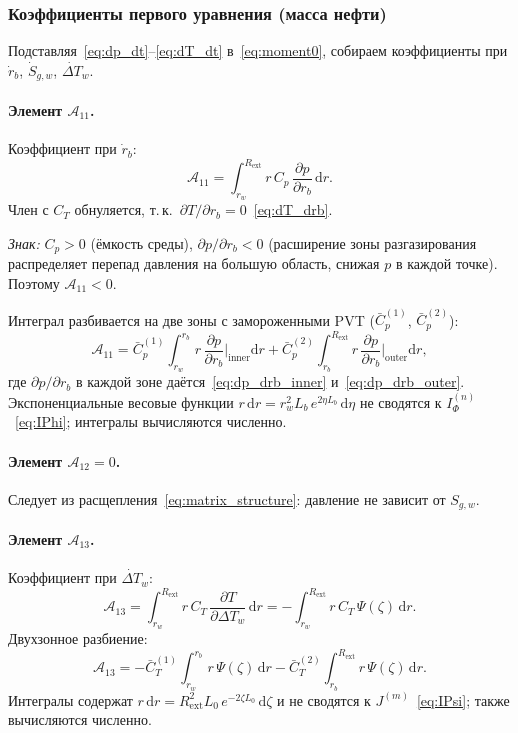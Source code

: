 \documentclass[12pt,a4paper]{article}
\newcommand{\dd}{\mathrm{d}}
\newcommand{\pp}{\partial}
\newcommand{\ext}{\mathrm{ext}}
\begin{document}
\subsubsection{Коэффициенты первого уравнения (масса нефти)}
\label{sssec:oil_mass_coefficients}

Подставляя~\eqref{eq:dp_dt}--\eqref{eq:dT_dt}
в~\eqref{eq:moment0}, собираем коэффициенты
при $\dot{r}_b$, $\dot{S}_{g,w}$, $\dot{\Delta T}_w$.

\paragraph{Элемент $\mathcal{A}_{11}$.}
Коэффициент при $\dot{r}_b$:
\begin{equation}\label{eq:A11}
  \boxed{
    \mathcal{A}_{11}
    = \int_{r_w}^{R_\ext} r\,C_p\,
      \frac{\pp p}{\pp r_b}\,\dd r.
  }
\end{equation}
Член с $C_T$ обнуляется, т.\,к.\ $\pp T/\pp r_b = 0$~\eqref{eq:dT_drb}.

\emph{Знак:} $C_p > 0$ (ёмкость среды),
$\pp p/\pp r_b < 0$ (расширение зоны разгазирования
распределяет перепад давления на большую область,
снижая $p$ в каждой точке).
Поэтому $\mathcal{A}_{11} < 0$.

Интеграл разбивается на две зоны с замороженными PVT
($\bar{C}_p^{(1)}$, $\bar{C}_p^{(2)}$):
\begin{equation}\label{eq:A11_zones}
  \mathcal{A}_{11}
  = \bar{C}_p^{(1)}\!\int_{r_w}^{r_b} r\,
      \frac{\pp p}{\pp r_b}\bigg|_\text{inner}\dd r
    + \bar{C}_p^{(2)}\!\int_{r_b}^{R_\ext} r\,
      \frac{\pp p}{\pp r_b}\bigg|_\text{outer}\dd r,
\end{equation}
где $\pp p/\pp r_b$ в каждой зоне
даётся~\eqref{eq:dp_drb_inner}
и~\eqref{eq:dp_drb_outer}.
Экспоненциальные весовые функции $r\,\dd r
= r_w^2 L_b\,e^{2\eta L_b}\,\dd\eta$ не сводятся к
$I_\Phi^{(n)}$~\eqref{eq:IPhi}; интегралы вычисляются
численно.

\paragraph{Элемент $\mathcal{A}_{12} = 0$.}
Следует из расщепления~\eqref{eq:matrix_structure}:
давление не зависит от $S_{g,w}$.

\paragraph{Элемент $\mathcal{A}_{13}$.}
Коэффициент при $\dot{\Delta T}_w$:
\begin{equation}\label{eq:A13}
  \boxed{
    \mathcal{A}_{13}
    = \int_{r_w}^{R_\ext} r\,C_T\,
      \frac{\pp T}{\pp\Delta T_w}\,\dd r
    = -\int_{r_w}^{R_\ext} r\,C_T\,\Psi(\zeta)\,\dd r.
  }
\end{equation}
Двухзонное разбиение:
\begin{equation}\label{eq:A13_zones}
  \mathcal{A}_{13}
  = -\bar{C}_T^{(1)}\!\int_{r_w}^{r_b} r\,\Psi(\zeta)\,\dd r
    - \bar{C}_T^{(2)}\!\int_{r_b}^{R_\ext} r\,\Psi(\zeta)\,\dd r.
\end{equation}
Интегралы содержат $r\,\dd r = R_\ext^2 L_0\,e^{-2\zeta L_0}\,\dd\zeta$
и не сводятся к $J^{(m)}$~\eqref{eq:IPsi}; также вычисляются численно.
\end{document}
